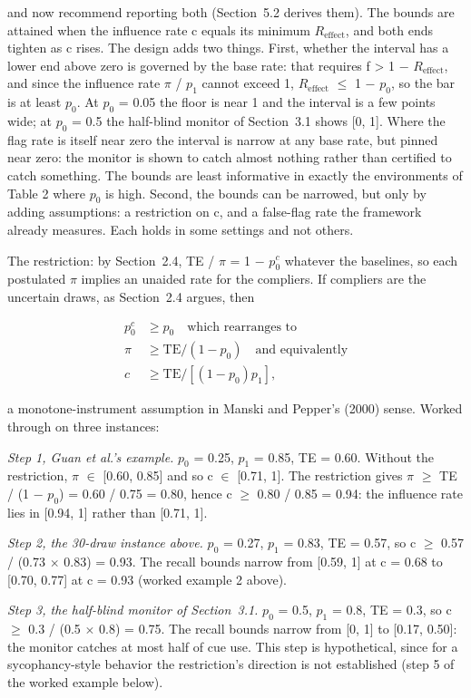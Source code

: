 \documentclass[11pt]{article}
\begin{document}
and now recommend reporting both (Section~5.2 derives them). The bounds are attained when the influence rate c equals its minimum $R_{\mathrm{effect}}$, and both ends tighten as c rises. The design adds two things. First, whether the interval has a lower end above zero is governed by the base rate: that requires f > 1 $-$ $R_{\mathrm{effect}}$, and since the influence rate $\pi$ / $p_1$ cannot exceed 1, $R_{\mathrm{effect}}$ $\leq$ 1 $-$ $p_0$, so the bar is at least $p_0$. At $p_0$ = 0.05 the floor is near 1 and the interval is a few points wide; at $p_0$ = 0.5 the half-blind monitor of Section~3.1 shows [0, 1]. Where the flag rate is itself near zero the interval is narrow at any base rate, but pinned near zero: the monitor is shown to catch almost nothing rather than certified to catch something. The bounds are least informative in exactly the environments of Table 2 where $p_0$ is high. Second, the bounds can be narrowed, but only by adding assumptions: a restriction on c, and a false-flag rate the framework already measures. Each holds in some settings and not others.

The restriction: by Section~2.4, TE / $\pi$ = 1 $-$ $p_0^{c}$ whatever the baselines, so each postulated $\pi$ implies an unaided rate for the compliers. If compliers are the uncertain draws, as Section~2.4 argues, then

\begin{align*}
  p_0^{c} &\geq p_0\quad\text{which rearranges to} \\
  \pi  &\geq \mathrm{TE} / (1 - p_0)\quad\text{and equivalently} \\
  c &\geq \mathrm{TE} / [(1 - p_0) p_1],
\end{align*}

a monotone-instrument assumption in Manski and Pepper's (2000) sense. Worked through on three instances:

\emph{Step 1, Guan et al.'s example.} $p_0$ = 0.25, $p_1$ = 0.85, TE = 0.60. Without the restriction, $\pi$ $\in$ [0.60, 0.85] and so c $\in$ [0.71, 1]. The restriction gives $\pi$ $\geq$ TE / (1 $-$ $p_0$) = 0.60 / 0.75 = 0.80, hence c $\geq$ 0.80 / 0.85 = 0.94: the influence rate lies in [0.94, 1] rather than [0.71, 1].

\emph{Step 2, the 30-draw instance above.} $p_0$ = 0.27, $p_1$ = 0.83, TE = 0.57, so c $\geq$ 0.57 / (0.73 $\times$ 0.83) = 0.93. The recall bounds narrow from [0.59, 1] at c = 0.68 to [0.70, 0.77] at c = 0.93 (worked example 2 above).

\emph{Step 3, the half-blind monitor of Section~3.1.} $p_0$ = 0.5, $p_1$ = 0.8, TE = 0.3, so c $\geq$ 0.3 / (0.5 $\times$ 0.8) = 0.75. The recall bounds narrow from [0, 1] to [0.17, 0.50]: the monitor catches at most half of cue use. This step is hypothetical, since for a sycophancy-style behavior the restriction's direction is not established (step 5 of the worked example below).
\end{document}
